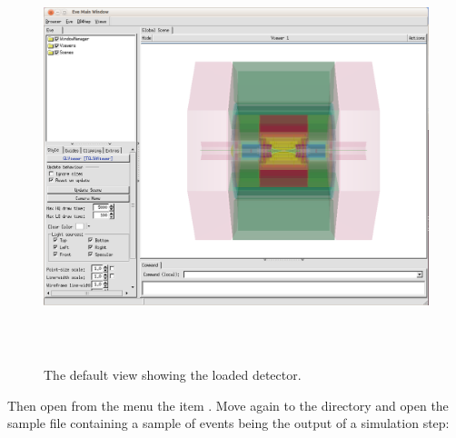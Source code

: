 \documentclass[10pt,a4paper]{article}
\begin{document}
\begin{figure}[t]
  \begin{center}
    \includegraphics[height=120mm] {DDEve_3}
    \caption{The \DDE default view showing the loaded detector.}
    \label{fig:DDEve_3}
  \end{center}
\end{figure}

\newpage
\noindent
Then open from the  menu the item . Move again to the 
directory  and open the sample file
 containing a sample of events being the output of 
a \DDG simulation step:
\end{document}
